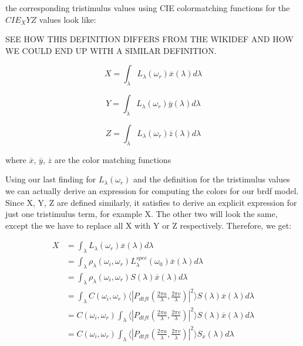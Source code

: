 the corresponding tristimulus values using CIE colormatching functions for the $CIE_XYZ$ values look like:

SEE HOW THIS DEFINITION DIFFERS FROM THE WIKIDEF AND HOW WE COULD END UP WITH A SIMILAR DEFINITION.

\begin{equation}
X = \int_{\lambda}L_\lambda(\omega_r)\overline{x}(\lambda)d\lambda
\end{equation} 

\begin{equation}
Y = \int_{\lambda}L_\lambda(\omega_r)\overline{y}(\lambda)d\lambda
\end{equation}

\begin{equation}
Z = \int_{\lambda}L_\lambda(\omega_r)\overline{z}(\lambda)d\lambda
\end{equation}

where $\overline{x}$, $\overline{y}$, $\overline{z}$ are the color matching functions

Using our last finding for $L_\lambda(\omega_r)$ and the definition for the tristimulus values we can actually derive an expression for computing the colors for our brdf model. Since X, Y, Z are defined similarly, it satisfies to derive an explicit expression for just one tristimulus term, for example X. The other two will look the same, except the we have to replace all X with Y or Z respectively. Therefore, we get:

\begin{align*}
X 
& =\int_{\lambda}L_\lambda(\omega_r)\overline{x}(\lambda)d\lambda \\
& =\int_{\lambda}\rho_\lambda(\omega_i,\omega_r)L_\lambda^{spec}(\omega_0) \overline{x}(\lambda)d\lambda \\
& =\int_{\lambda}\rho_\lambda(\omega_i,\omega_r) S(\lambda) \overline{x}(\lambda)d\lambda \\
& =\int_{\lambda} C(\omega_i,\omega_r) \langle \left|P_{dtft}(\frac{2\pi u}{\lambda}, \frac{2\pi v}{\lambda})\right|^2\rangle S(\lambda) \overline{x}(\lambda)d\lambda \\
& = C(\omega_i,\omega_r) \int_{\lambda} \langle \left|P_{dtft}(\frac{2\pi u}{\lambda}, \frac{2\pi v}{\lambda})\right|^2\rangle S(\lambda) \overline{x}(\lambda)d\lambda \\
& = C(\omega_i,\omega_r) \int_{\lambda} \langle \left|P_{dtft}(\frac{2\pi u}{\lambda}, \frac{2\pi v}{\lambda})\right|^2\rangle S_x(\lambda)d\lambda
\end{align*}

